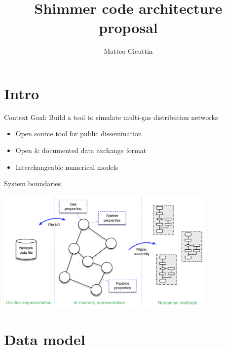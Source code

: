 \documentclass[10pt,aspectratio=169]{beamer}
\title{Shimmer code architecture proposal}
\author{Matteo Cicuttin}
\institute{DISMA - PoliTO}
\begin{document}
\maketitle

\section{Intro}
\begin{frame}{Context}
    Goal: Build a tool to simulate multi-gas distribution networks

    \vspace{3mm}

    \begin{itemize}
        \item Open source tool for public dissemination
        \item Open \& documented data exchange format
        \item Interchangeable numerical models
    \end{itemize}

\end{frame}

\begin{frame}{System boundaries}

\begin{center}
    \includegraphics[width=0.8\textwidth]{img/system_arch}
\end{center}

\end{frame}

\section{Data model}
\end{document}
